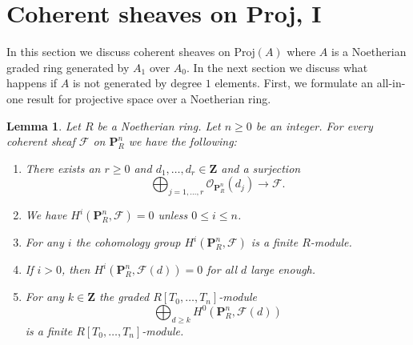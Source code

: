\documentclass{stacks-project}
\theoremstyle{plain}
\newtheorem{lemma}[subsection]{Lemma}
\theoremstyle{definition}
\theoremstyle{remark}
\numberwithin{equation}{subsection}
\begin{document}
\section{Coherent sheaves on Proj, I}
\label{section-coherent-proj}

\noindent
In this section we discuss coherent sheaves on $\text{Proj}(A)$
where $A$ is a Noetherian graded ring generated by $A_1$ over $A_0$.
In the next section we discuss what happens if $A$ is not generated
by degree $1$ elements. First, we formulate an all-in-one result for
projective space over a Noetherian ring.

\begin{lemma}
\label{lemma-coherent-projective}
Let $R$ be a Noetherian ring.
Let $n \geq 0$ be an integer.
For every coherent sheaf $\mathcal{F}$ on $\mathbf{P}^n_R$
we have the following:
\begin{enumerate}
\item There exists an $r \geq 0$ and
$d_1, \ldots, d_r \in \mathbf{Z}$ and a surjection
$$
\bigoplus\nolimits_{j = 1, \ldots, r}
\mathcal{O}_{\mathbf{P}^n_R}(d_j)
\longrightarrow
\mathcal{F}.
$$
\item We have $H^i(\mathbf{P}^n_R, \mathcal{F}) = 0$ unless
$0 \leq i \leq n$.
\item For any $i$ the cohomology group $H^i(\mathbf{P}^n_R, \mathcal{F})$
is a finite $R$-module.
\item If $i > 0$, then
$H^i(\mathbf{P}^n_R, \mathcal{F}(d)) = 0$ for all $d$ large enough.
\item For any $k \in \mathbf{Z}$ the graded $R[T_0, \ldots, T_n]$-module
$$
\bigoplus\nolimits_{d \geq k} H^0(\mathbf{P}^n_R, \mathcal{F}(d))
$$
is a finite $R[T_0, \ldots, T_n]$-module.
\end{enumerate}
\end{lemma}
\end{document}
